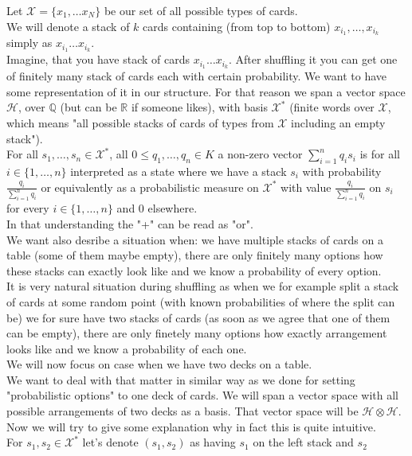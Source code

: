 \documentclass[a4paper, 12pt]{report}
\begin{document}
Let $\mathcal{X} = \{x_1, \dots x_N\}$ be our set of all possible types of cards. \\
We will denote a stack of $k$ cards containing (from top to bottom) $x_{i_1}, \dots, x_{i_k}$ simply as
$x_{i_1}\dots x_{i_k}$. \\
Imagine, that you have stack of cards $x_{i_1}\dots x_{i_k}$. After shuffling it
you can get one of finitely many stack of cards each with certain probability. We want to have some
representation of it in our structure.
For that reason we span a vector space $\mathcal{H}$, over $\mathbb{Q}$ (but can be $\mathbb{R}$ if someone
likes),
with basis $\mathcal{X}^*$ (finite words over $\mathcal{X}$, which means "all possible stacks
of cards of types from $\mathcal{X}$ including an empty stack"). \\
For all $s_1, \dots, s_n \in \mathcal{X}^*$, all $0 \leq q_1, \dots, q_n \in K$ a non-zero vector
$\displaystyle\sum^{n}_{i = 1} q_is_i$ is for all $i \in \{1, \dots, n\}$
interpreted as a state where we have a stack $s_i$ with probability $\frac{q_i}{\sum^n_{i=1} q_i}$ or
equivalently as a probabilistic measure on $\mathcal{X}^*$ with value $\frac{q_i}{\sum^n_{i=1} q_i}$ on $s_i$
for every $i \in \{1, \dots, n\}$ and $0$ elsewhere. \\
In that understanding the "+" can be read as "or". \\
We want also desribe a situation when: we have multiple stacks of cards on a table (some of them maybe
empty), there are only finitely many options how
these stacks can exactly look like and we know a probability of every option.\\
It is very natural situation during shuffling as when we for example split a stack of cards at some
random point (with known probabilities of where the split can be)
we for sure have two stacks of cards (as soon as we agree that one of them can be empty),
there are only finetely many options how exactly arrangement looks like and we know a probability of each
one.
\\ We will now focus on case when we have two decks on a table. \\
We want to deal with that matter in similar way as we done for setting "probabilistic options" to one deck
of cards. We will span a vector space with all possible arrangements of two decks as a basis.
That vector space will be $\mathcal{H} \otimes \mathcal{H}$. Now we will try to give some explanation why in
fact this is quite intuitive.  \\
For $s_1, s_2 \in \mathcal{X}^*$ let's denote $(s_1, s_2)$ as having $s_1$ on the left stack and $s_2$
\end{document}
